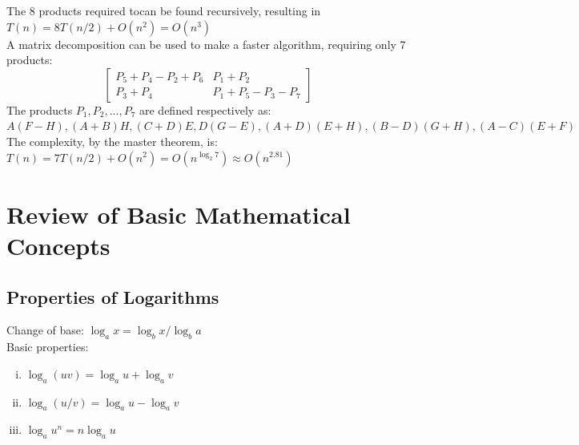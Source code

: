 \documentclass{article}
\begin{document}
			The 8 products required tocan be found recursively, resulting in $T(n) = 8T(n/2) + O(n^2) = O(n^3)$ \\
			A matrix decomposition can be used to make a faster algorithm, requiring only 7 products:
			\begin{equation*}
				\begin{bmatrix}
					P_5 + P_4 - P_2 + P_6 & P_1 + P_2 \\
					P_3 + P_4 & P_1 + P_5 - P_3 - P_7
					\end{bmatrix}
				\end{equation*}
			The products $P_1, P_2, ..., P_7$ are defined respectively as: \\
			$A(F - H), (A + B)H, (C + D)E, D(G - E), (A + D)(E + H), (B - D)(G + H), (A - C)(E + F)$ \\
			The complexity, by the master theorem, is: $T(n) = 7T(n/2) + O(n^2) = O(n^{\log_2 7}) \approx O(n^{2.81})$
		\clearpage
		
	\appendix

	\section{Review of Basic Mathematical Concepts}
		\subsection{Properties of Logarithms}
			Change of base: $\log_a x = \log_b x/\log_b a$ \\
			Basic properties:
			\begin{enumerate}[(i)]
				\item $\log_a(uv) = \log_a u + \log_a v$
				\item $\log_a(u / v) = \log_a u - \log_a v$
				\item $\log_a u^n = n \log_a u$
				\end{enumerate}



	
\end{document}
